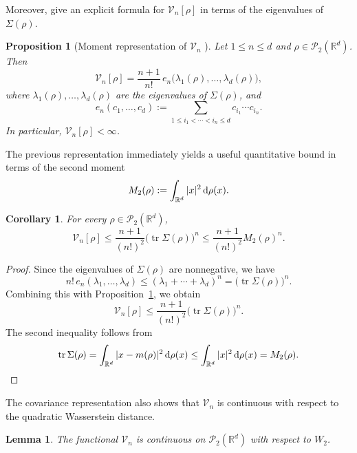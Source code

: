 \documentclass[11pt,reqno]{amsart}
\numberwithin{figure}{section}
\def\d {{\partial}}
\def\d{\mathrm{d}}
\renewcommand{\d}{  {\textup{d}} }
\newtheorem{lemma}{Lemma}[section]
\newtheorem{corollary}{Corollary}[section]
\newtheorem{proposition}{Proposition}[section]
\begin{document}
Moreover, \cite{pronzato2017extended,WZ} give an explicit formula for
$\mathcal V_n[\rho]$ in terms of the eigenvalues of $\Sigma(\rho)$.

\begin{proposition}[Moment representation of $\mathcal V_n$ {\cite{pronzato2017extended,WZ}}]
	\label{prop:moment-representation}
	Let $1\le n\le d$ and $\rho\in\mathcal P_2(\mathbb R^d)$. Then
	\[
	\mathcal V_n[\rho]
	=
	\frac{n+1}{n!}\,
	e_n\bigl(\lambda_1(\rho),\dots,\lambda_d(\rho)\bigr),
	\]
	where $\lambda_1(\rho),\dots,\lambda_d(\rho)$ are the eigenvalues of $\Sigma(\rho)$, and
	\[
	e_n(c_1,\dots,c_d)
	:=
	\sum_{1\le i_1<\cdots<i_n\le d} c_{i_1}\cdots c_{i_n}.
	\]
	In particular, $\mathcal V_n[\rho]<\infty$.
\end{proposition}

The previous representation immediately yields a useful quantitative bound in terms of the second moment
\[
M_2(\rho):=\int_{\mathbb R^d}|x|^2\,\d\rho(x).
\]

\begin{corollary}
	\label{cor:Vn-upper-bound}
	For every $\rho\in\mathcal P_2(\mathbb R^d)$,
	\[
	\mathcal V_n[\rho]
	\le
	\frac{n+1}{(n!)^2}\bigl(\operatorname{tr}\Sigma(\rho)\bigr)^n
	\le
	\frac{n+1}{(n!)^2}M_2(\rho)^n.
	\]
\end{corollary}

\begin{proof}
	Since the eigenvalues of $\Sigma(\rho)$ are nonnegative, we have
	\[
	n!\,e_n(\lambda_1,\dots,\lambda_d)
	\le
	(\lambda_1+\cdots+\lambda_d)^n
	=
	\bigl(\operatorname{tr}\Sigma(\rho)\bigr)^n.
	\]
	Combining this with Proposition~\ref{prop:moment-representation}, we obtain
	\[
	\mathcal V_n[\rho]
	\le
	\frac{n+1}{(n!)^2}\bigl(\operatorname{tr}\Sigma(\rho)\bigr)^n.
	\]
	The second inequality follows from
	\[
	\operatorname{tr}\Sigma(\rho)
	=
	\int_{\mathbb R^d}|x-m(\rho)|^2\,\d\rho(x)
	\le
	\int_{\mathbb R^d}|x|^2\,\d\rho(x)
	=
	M_2(\rho).
	\]
\end{proof}

The covariance representation also shows that $\mathcal V_n$ is continuous with respect to the quadratic Wasserstein distance.

\begin{lemma}
	\label{lem:Vn-W2-continuity}
	The functional $\mathcal V_n$ is continuous on $\mathcal P_2(\mathbb R^d)$ with respect to $W_2$.
\end{lemma}
\end{document}
